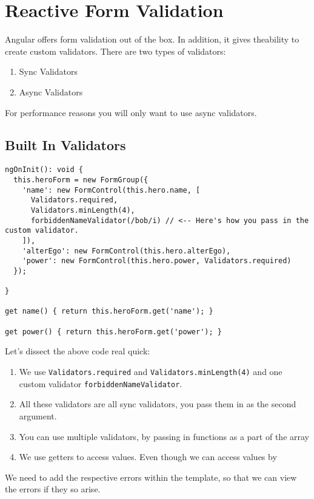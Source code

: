 \section{ Reactive Form Validation }
Angular offers form validation out of the box. In addition, it gives theability to create custom validators. There are two types of validators: 
\begin{enumerate}
  \item Sync Validators
  \item Async Validators
\end{enumerate}

For performance reasons you will only want to use async validators. 

\subsection{Built In Validators}

\begin{lstlisting}
ngOnInit(): void {
  this.heroForm = new FormGroup({
    'name': new FormControl(this.hero.name, [
      Validators.required,
      Validators.minLength(4),
      forbiddenNameValidator(/bob/i) // <-- Here's how you pass in the custom validator.
    ]),
    'alterEgo': new FormControl(this.hero.alterEgo),
    'power': new FormControl(this.hero.power, Validators.required)
  });

}

get name() { return this.heroForm.get('name'); }

get power() { return this.heroForm.get('power'); }
\end{lstlisting}

Let's dissect the above code real quick: 

\begin{enumerate}
  \item We use \lstinline{Validators.required} and \lstinline{Validators.minLength(4)} and one custom validator \lstinline{forbiddenNameValidator}.
  \item All these validators are all sync validators, you pass them in as the second argument.
  \item You can use multiple validators, by passing in functions as a part of the array
  \item We use getters to access values. Even though we can access values by
  
\end{enumerate}

We need to add the respective errors within the template, so that we can view the errors if they so arise. 


